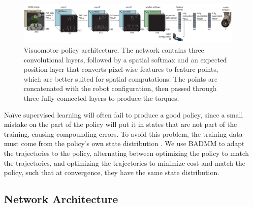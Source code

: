 \documentclass[final]{IEEEtran}
\begin{document}
\begin{figure}[t]
\centering
\includegraphics[width=\textwidth]{imgs/network_diagram.pdf}
\vspace{-0.3in}
\caption{Visuomotor policy architecture. The network contains three convolutional layers, followed by a spatial softmax and an expected position layer that converts pixel-wise features to feature points, which are better suited for spatial computations. The points are concatenated with the robot configuration, then passed through three fully connected layers to produce the torques.
}
\vspace{-0.15in}
\label{fig:nn}
\end{figure}

Na\"{i}ve supervised learning will often fail to produce a good policy, since a small mistake on the part of the policy will put it in states that are not part of the training, causing compounding errors. To avoid this problem, the training data must come from the policy's own state distribution \cite{rgb-rilsp-11}. We use BADMM \cite{wb-badmm-14} to adapt the trajectories to the policy, alternating between optimizing the policy to match the trajectories, and optimizing the trajectories to minimize cost and match the policy, such that at convergence, they have the same state distribution.


\subsection{Network Architecture}
\label{sec:policyarch}
\end{document}
